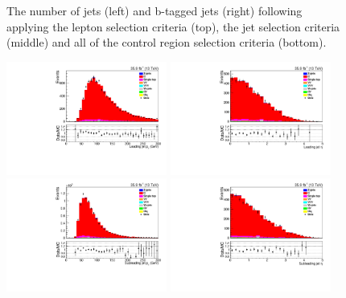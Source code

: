 \begin{figure}[h]
\caption{
The number of jets (left) and b-tagged jets (right) following applying the lepton selection criteria (top), the jet selection criteria (middle) and all of the \ttbar control region selection criteria (bottom).
}
\label{fig:ttbar_nJets}
\end{figure}

\begin{figure}[h]
\centering
\includegraphics[width=0.47\textwidth]{figs/background-estimation/plots/unblinded/ttbar_control/leadingJetPt_SingleTop_jetSel_emu.pdf}
\includegraphics[width=0.47\textwidth]{figs/background-estimation/plots/unblinded/ttbar_control/leadingJetEta_SingleTop_jetSel_emu.pdf}
\\
\includegraphics[width=0.47\textwidth]{figs/background-estimation/plots/unblinded/ttbar_control/secondJetPt_SingleTop_jetSel_emu.pdf}
\includegraphics[width=0.47\textwidth]{figs/background-estimation/plots/unblinded/ttbar_control/secondJetEta_SingleTop_jetSel_emu.pdf}

\end{figure}
